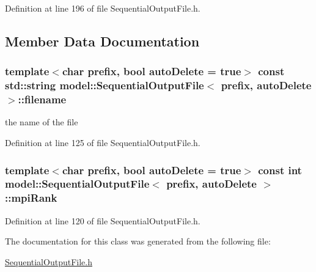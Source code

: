 Definition at line 196 of file Sequential\+Output\+File.\+h.



\subsection{Member Data Documentation}
\hypertarget{classmodel_1_1_sequential_output_file_a9acc4f5dff4bc41b078b4f4d96b39848}{}
\subsubsection[{filename}]{\setlength{\rightskip}{0pt plus 5cm}template$<$char prefix, bool auto\+Delete = true$>$ const std\+::string {\bf model\+::\+Sequential\+Output\+File}$<$ prefix, auto\+Delete $>$\+::filename}\label{classmodel_1_1_sequential_output_file_a9acc4f5dff4bc41b078b4f4d96b39848}


the name of the file 



Definition at line 125 of file Sequential\+Output\+File.\+h.

\hypertarget{classmodel_1_1_sequential_output_file_a64750e7b97623991408225aabaef179f}{}
\subsubsection[{mpi\+Rank}]{\setlength{\rightskip}{0pt plus 5cm}template$<$char prefix, bool auto\+Delete = true$>$ const int {\bf model\+::\+Sequential\+Output\+File}$<$ prefix, auto\+Delete $>$\+::mpi\+Rank}\label{classmodel_1_1_sequential_output_file_a64750e7b97623991408225aabaef179f}


Definition at line 120 of file Sequential\+Output\+File.\+h.



The documentation for this class was generated from the following file\+:\begin{DoxyCompactItemize}
\item 
\hyperlink{_sequential_output_file_8h}{Sequential\+Output\+File.\+h}\end{DoxyCompactItemize}
